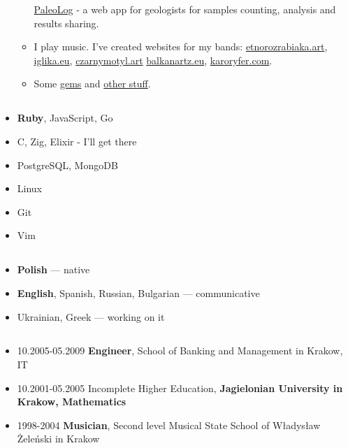 \documentclass[a4paper]{article}
\begin{document}
\begin{itemize}
\begin{itemize}
        \href{https://github.com/mradmacher/paleolog}{PaleoLog} - a web app for geologists for samples counting, analysis and results sharing.
      \item
        I play music. I've created websites for my bands: \href{https://etnorozrabiaka.art}{etnorozrabiaka.art}, \href{https://iglika.eu}{iglika.eu}, \href{https://czarnymotyl.art}{czarnymotyl.art} \href{https://balkanartz.eu}{balkanartz.eu}, \href{https://karoryfer.com}{karoryfer.com}.
      \item
        Some \href{https://rubygems.org/profiles/mradmacher}{gems} and \href{https://github.com/mradmacher?tab=repositories}{other stuff}.
    \end{itemize}
\end{itemize}

\subsection*{}
\begin{itemize}
\item
  \textbf{Ruby}, JavaScript, Go
\item
  C, Zig, Elixir - I'll get there
\item
  PostgreSQL, MongoDB
\item
  Linux
\item
  Git
\item
  Vim
\end{itemize}

\subsection*{}
\begin{itemize}
\item
  \textbf{Polish} --- native
\item
  \textbf{English}, Spanish, Russian, Bulgarian --- communicative
\item
  Ukrainian, Greek --- working on it
\end{itemize}

\subsection*{}
\begin{itemize}
  \item
    10.2005-05.2009 \textbf{Engineer}, School of Banking and Management in Krakow, IT

  \item
    10.2001-05.2005 Incomplete Higher Education,
    \textbf{Jagielonian University in Krakow, Mathematics}

  \item
    1998-2004 \textbf{Musician},
    Second level Musical State School of Władysław Żeleński in Krakow
\end{itemize}
\end{document}
